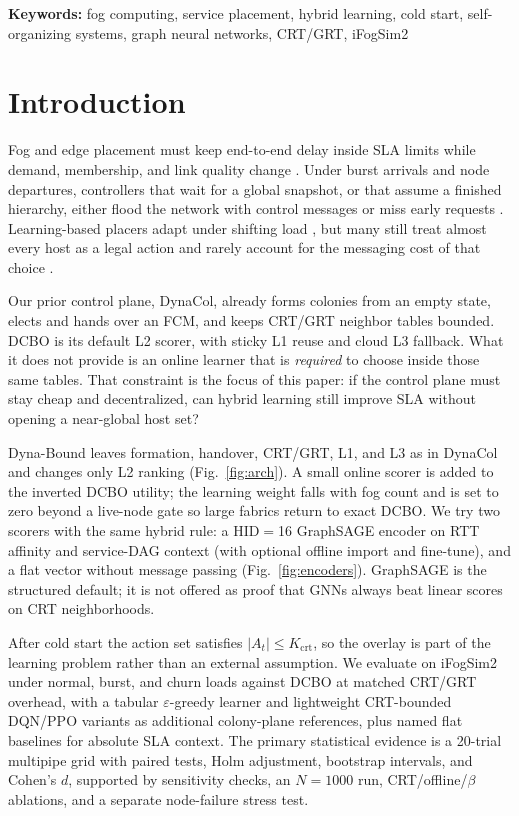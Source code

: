 \documentclass[11pt,a4paper]{article}
\begin{document}
\noindent\textbf{Keywords:}
fog computing, service placement, hybrid learning, cold start,
self-organizing systems, graph neural networks, CRT/GRT, iFogSim2

\section{Introduction}
\label{sec:intro}

Fog and edge placement must keep end-to-end delay inside SLA limits while demand,
membership, and link quality change
\cite{bonomi_mcc2012,chiang_jiot2016,yousefpour_sysarc2019,mouradian_comst2018}.
Under burst arrivals and node departures, controllers that wait for a global
snapshot, or that assume a finished hierarchy, either flood the network with
control messages or miss early requests
\cite{salaht_csur2020,taleb_csur2025_survey,gasmi_jsup2021_survey}.
Learning-based placers adapt under shifting load
\cite{supraja_cluster2025_slr,schulman_ppo2017,haddadha_aire2024_mlplacement},
but many still treat almost every host as a legal action and rarely account for
the messaging cost of that choice
\cite{hong_csur2019_resource,abdulazeez_access2023_offload}.

Our prior control plane, DynaCol, already forms colonies from an empty state,
elects and hands over an FCM, and keeps CRT/GRT neighbor tables bounded. DCBO is
its default L2 scorer, with sticky L1 reuse and cloud L3 fallback. What it does
not provide is an online learner that is \emph{required} to choose inside those
same tables. That constraint is the focus of this paper: if the control plane
must stay cheap and decentralized, can hybrid learning still improve SLA without
opening a near-global host set?

Dyna-Bound leaves formation, handover, CRT/GRT, L1, and L3 as in DynaCol and
changes only L2 ranking (Fig.~\ref{fig:arch}). A small online scorer is added to
the inverted DCBO utility; the learning weight falls with fog count and is set
to zero beyond a live-node gate so large fabrics return to exact DCBO. We try
two scorers with the same hybrid rule: a HID$=$16 GraphSAGE encoder on RTT
affinity and service-DAG context (with optional offline import and fine-tune),
and a flat vector without message passing (Fig.~\ref{fig:encoders}). GraphSAGE is
the structured default; it is not offered as proof that GNNs always beat linear
scores on CRT neighborhoods.

After cold start the action set satisfies $|A_t|\le K_{\mathrm{crt}}$, so the
overlay is part of the learning problem rather than an external assumption.
We evaluate on iFogSim2 under normal, burst, and churn loads against DCBO at
matched CRT/GRT overhead, with a tabular $\varepsilon$-greedy learner and
lightweight CRT-bounded DQN/PPO variants as additional colony-plane references,
plus named flat baselines for absolute SLA context. The primary statistical
evidence is a 20-trial multipipe grid with paired tests, Holm adjustment,
bootstrap intervals, and Cohen's $d$, supported by sensitivity checks, an
$N{=}1000$ run, CRT/offline/$\beta$ ablations, and a separate node-failure stress
test.
\end{document}
